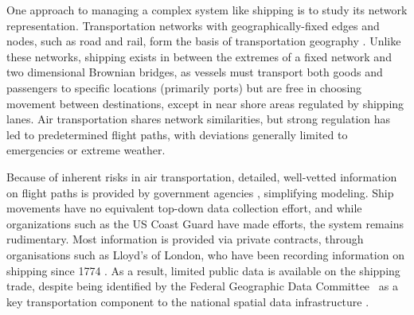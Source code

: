 


One approach to managing a complex system like shipping is to study its network representation.  Transportation networks with geographically-fixed edges and nodes, such as road and rail, form the basis of transportation geography \citep{Rodrigue2009}. Unlike these networks, shipping exists in between the extremes of a fixed network %
 and two dimensional Brownian bridges, as vessels must transport both goods and passengers to specific locations (primarily ports) but are free in choosing movement between destinations, except in near shore areas regulated by shipping lanes. Air transportation shares network similarities, but strong regulation has led to predetermined flight paths, with deviations generally limited to emergencies or extreme weather. %

Because of inherent risks in air transportation, detailed, well-vetted information on flight paths is provided by government agencies \citep{guimera2005worldwide}, simplifying modeling. Ship movements have no equivalent top-down data collection effort, and while organizations such as the US Coast Guard have made efforts, the system remains rudimentary. Most information is provided via private contracts, through organisations such as Lloyd's of London, who have been recording information on shipping since 1774 \citep{Lloyd'sRegister-FairplayLtd.2010}. As a result, limited public data is available on the shipping trade, despite being identified by the Federal Geographic Data Committee~\citep{FGDC} as a key transportation component to the national spatial data infrastructure \citep{CurrierInPress}.

